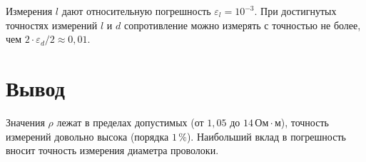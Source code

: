 Измерения $l$ дают относительную погрешность $\varepsilon_l=10^{-3}$. При достигнутых точностях измерений $l$ и $d$ сопротивление можно
измерять с точностью не более, чем $2\cdot\varepsilon_d/2\approx0{,}01$.

\section{Вывод}
Значения $\rho$ лежат в пределах допустимых (от $1{,}05$ до $1{4}\,\text{Ом}\cdot\text{м}$), точность измерений довольно высока (порядка $1\,\%$). Наибольший вклад в погрешность вносит
точность измерения диаметра проволоки.
